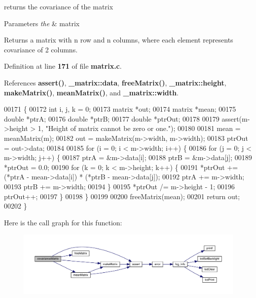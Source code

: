 returns the covariance of the matrix 


\begin{DoxyParams}{Parameters}
{\em the} & matrix \\
\hline
\end{DoxyParams}
\begin{DoxyReturn}{Returns}
a matrix with n row and n columns, where each element represents covariance of 2 columns. 
\end{DoxyReturn}


Definition at line \textbf{ 171} of file \textbf{ matrix.\+c}.



References \textbf{ assert()}, \textbf{ \+\_\+matrix\+::data}, \textbf{ free\+Matrix()}, \textbf{ \+\_\+matrix\+::height}, \textbf{ make\+Matrix()}, \textbf{ mean\+Matrix()}, and \textbf{ \+\_\+matrix\+::width}.


\begin{DoxyCode}
00171                                     \{
00172   \textcolor{keywordtype}{int} i, j, k = 0;
00173   matrix *out;
00174   matrix *mean;
00175   \textcolor{keywordtype}{double} *ptrA;
00176   \textcolor{keywordtype}{double} *ptrB;
00177   \textcolor{keywordtype}{double} *ptrOut;
00178 
00179   assert(m->height > 1, \textcolor{stringliteral}{"Height of matrix cannot be zero or one."});
00180 
00181   mean = meanMatrix(m);
00182   out = makeMatrix(m->width, m->width);
00183   ptrOut = out->data;
00184 
00185   \textcolor{keywordflow}{for} (i = 0; i < m->width; i++) \{
00186     \textcolor{keywordflow}{for} (j = 0; j < m->width; j++) \{
00187       ptrA = &m->data[i];
00188       ptrB = &m->data[j];
00189       *ptrOut = 0.0;
00190       \textcolor{keywordflow}{for} (k = 0; k < m->height; k++) \{
00191         *ptrOut += (*ptrA - mean->data[i]) * (*ptrB - mean->data[j]);
00192         ptrA += m->width;
00193         ptrB += m->width;
00194       \}
00195       *ptrOut /= m->height - 1;
00196       ptrOut++;
00197     \}
00198   \}
00199 
00200   freeMatrix(mean);
00201   \textcolor{keywordflow}{return} out;
00202 \}
\end{DoxyCode}
Here is the call graph for this function\+:
\nopagebreak
\begin{figure}[H]
\begin{center}
\leavevmode
\includegraphics[width=350pt]{matrix_8h_ae6dab569959c360cf165136a3b625edd_cgraph}
\end{center}
\end{figure}
\mbox{\label{matrix_8h_af49b525d7476c365833db9acd975e3a5}} 
